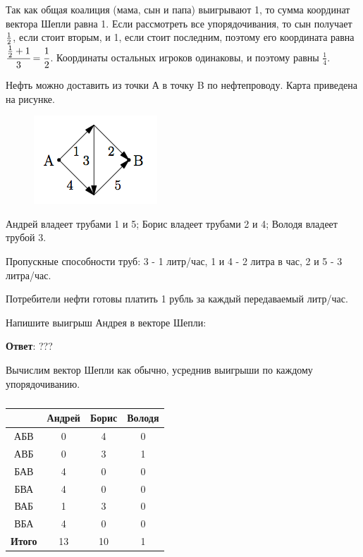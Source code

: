 	\solution
	Так как общая коалиция (мама, сын и папа) выигрывают 1, то сумма координат вектора Шепли равна 1. Если рассмотреть все упорядочивания, то сын получает $1 \over 2$, если стоит вторым, и 1, если стоит последним, поэтому его координата равна $\cfrac{\frac{1}{2}+1}{3} = \cfrac{1}{2}$. Координаты остальных игроков одинаковы, и поэтому равны $\frac{1}{4}$.
	
	\task
	Нефть можно доставить из точки А в точку B по нефтепроводу. Карта приведена на рисунке.
	
	\begin{figure}
		\centering
		\includegraphics[width=\linewidth]{week6-control-1}
		\caption{}
		\label{fig:week6-control-2}
	\end{figure}
	
	Андрей владеет трубами 1 и 5; Борис владеет трубами 2 и 4; Володя владеет трубой 3.
	
	Пропускные способности труб: 3 - 1 литр/час, 1 и 4 - 2 литра в час, 2 и 5 - 3 литра/час.
	
	Потребители нефти готовы платить 1 рубль за каждый передаваемый литр/час.
	
	Напишите выигрыш Андрея в векторе Шепли:
	
	\textbf{Ответ}: ??? %
	
	\solution
	\label{week6-control-2:tube}
	Вычислим вектор Шепли как обычно, усреднив выигрыши по каждому упорядочиванию.
	
	\begin{table}[h]
		\label{week6-control2:table1}
		\caption{}
		\centering
	\begin{tabular}{|c|c|c|c|}
		\hline 
		& Андрей & Борис & Володя \\ 
		\hline 
		АБВ & 0 & 4 & 0 \\ 
		\hline 
		АВБ & 0 & 3 & 1 \\ 
		\hline 
		БАВ & 4 & 0 & 0 \\ 
		\hline 
		БВА & 4 & 0 & 0 \\ 
		\hline 
		ВАБ & 1 & 3 & 0 \\ 
		\hline 
		ВБА & 4 & 0 & 0 \\ 
		\hline
		\textbf{Итого} & 13 & 10 & 1 \\
		\hline
	\end{tabular}
	\end{table}

